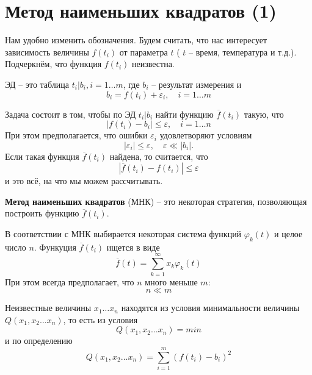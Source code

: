\section{Метод наименьших квадратов (1)}

\label{lecture5}
Нам удобно изменить обозначения. Будем считать, что нас интересует зависимость величины $f(t_i)$ от параметра  $t$ ( $t$ -- время, температура и т.д.). Подчеркнём, что функция $f(t_i)$ неизвестна.

ЭД -- это таблица $t_i | b_i, i = 1 \dots m$, где $b_i$ -- результат измерения и 
\begin{equation}
	b_i = f(t_i) + \varepsilon_i, \quad i = 1 \dots m
\end{equation}

Задача состоит в том, чтобы по ЭД  $t_i | b_i$ найти функцию $\overline f(t_i)$ такую, что 
\begin{equation}
	|f(t_i) - b_i| \leq \varepsilon, \quad i = 1 \dots n
\end{equation}
При этом предполагается, что ошибки $\varepsilon_i$ удовлетворяют условиям
\begin{equation}
	|\varepsilon_i | \leq \varepsilon , \quad \varepsilon \ll  |b_i| .
\end{equation}
Если такая функция $\overline f(t_i)$ найдена, то считается, что
\begin{equation}
	|\overline f(t_i) - f(t_i) | \leq \varepsilon
\end{equation}
и это всё, на что мы можем рассчитывать.


\textbf{Метод наименьших квадратов} (МНК) --  это некоторая стратегия, позволяющая построить функцию $\overline f(t_i)$.

В соответствии с МНК выбирается некоторая система функций $\varphi_k (t) $ и целое число $n$. Функуция $\overline f(t_i)$ ищется в виде 
\begin{equation}
	\overline{f} (t) = \sum_{k=1}^{\infty} {x_k \varphi_k (t) }
\end{equation}
При этом всегда предполагает, что $n$ много меньше $m$:
\begin{equation}
	n \ll m
\end{equation}

Неизвестные величины $x_1 \dots x_n$ находятся из условия минимальности величины $Q(x_1, x_2 \dots x_n)$, то есть из условия
\begin{equation} \label{eq:5.7}
	Q(x_1, x_2 \dots x_n) = min
\end{equation}
и по определению
\begin{equation} 
	Q(x_1, x_2 \dots x_n) = \sum_{i=1}^m {(f(t_i) - b_i)^2}
\end{equation}

